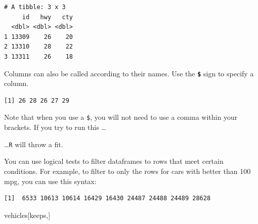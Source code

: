 \documentclass[
]{book}
\newenvironment{Shaded}{\begin{snugshade}}{\end{snugshade}}
\newcommand{\DecValTok}[1]{\textcolor[rgb]{0.00,0.00,0.81}{#1}}
\newcommand{\KeywordTok}[1]{\textcolor[rgb]{0.13,0.29,0.53}{\textbf{#1}}}
\newcommand{\NormalTok}[1]{#1}
\newcommand{\OperatorTok}[1]{\textcolor[rgb]{0.81,0.36,0.00}{\textbf{#1}}}
\newcommand{\StringTok}[1]{\textcolor[rgb]{0.31,0.60,0.02}{#1}}
\begin{document}
\begin{verbatim}
# A tibble: 3 x 3
     id   hwy   cty
  <dbl> <dbl> <dbl>
1 13309    26    20
2 13310    28    22
3 13311    26    18
\end{verbatim}

Columns can also be called according to their names. Use the \textbf{\texttt{\$}} sign to specify a column.

\begin{Shaded}
\end{Shaded}

\begin{verbatim}
[1] 26 28 26 27 29
\end{verbatim}

Note that when you use a \texttt{\$}, you will not need to use a comma within your brackets. If you try to run this \ldots{}

\begin{Shaded}
\end{Shaded}

\ldots{}\texttt{R} will throw a fit.

You can use logical tests to filter dataframes to rows that meet certain conditions. For example, to filter to only the rows for cars with better than 100 mpg, you can use this syntax:

\begin{Shaded}
\end{Shaded}

\begin{verbatim}
[1]  6533 10613 10614 16429 16430 24487 24488 24489 28628
\end{verbatim}

\begin{Shaded}
\begin{Highlighting}[]
\NormalTok{vehicles[keeps,]}
\end{Highlighting}
\end{Shaded}
\end{document}
